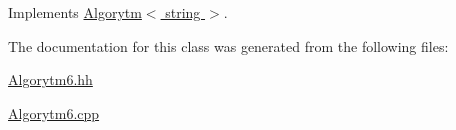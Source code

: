 Implements \hyperlink{a00001_ae97a52b1a728be1a819c9e9815f424e7}{Algorytm$<$ string $>$}.



The documentation for this class was generated from the following files\+:\begin{DoxyCompactItemize}
\item 
\hyperlink{a00029}{Algorytm6.\+hh}\item 
\hyperlink{a00028}{Algorytm6.\+cpp}\end{DoxyCompactItemize}
